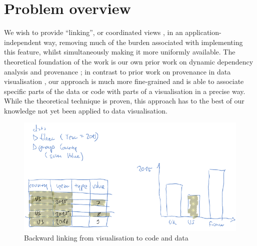 \section{Problem overview}
\label{sec:problem-overview}

We wish to provide ``linking'', or coordinated views \cite{tobiasz09}, in an
application-independent way, removing much of the burden associated with
implementing this feature, whilst simultaneously making it more uniformly
available. The theoretical foundation of the work is our own prior work on
dynamic dependency analysis and provenance \cite{perera16d, ricciotti17}; in
contrast to prior work on provenance in data visualisation \cite{callahan06},
our approach is much more fine-grained and is able to associate specific parts
of the data or code with parts of a visualisation in a precise way. While the
theoretical technique is proven, this approach has to the best of our knowledge
not yet been applied to data visualisation.

\begin{figure}[h]
\includegraphics[scale=0.35]{image/chart-bwd}
\caption{Backward linking from visualisation to code and data}
\end{figure}
